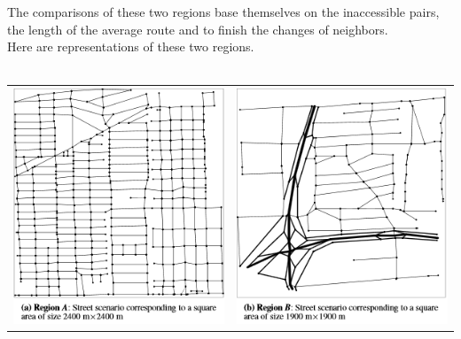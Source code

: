 The comparisons of these two regions base themselves on the inaccessible pairs, the length of the average route and to finish the changes of neighbors.\\

Here are representations of these two regions.\\\\

\begin{tabular}{cc}
   \includegraphics{../images/cityA.png} &
   \includegraphics{../images/cityB.png} \\
\end{tabular}

\newpage

